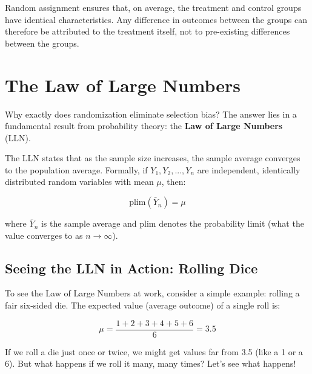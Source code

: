 \documentclass[
  letterpaper,
  DIV=11,
  numbers=noendperiod]{scrreprt}
\begin{document}
\begin{tcolorbox}[enhanced jigsaw, arc=.35mm, bottomrule=.15mm, bottomtitle=1mm, breakable, colback=white, colbacktitle=quarto-callout-important-color!10!white, colframe=quarto-callout-important-color-frame, coltitle=black, left=2mm, leftrule=.75mm, opacityback=0, opacitybacktitle=0.6, rightrule=.15mm, title=\textcolor{quarto-callout-important-color}{\faExclamation}\hspace{0.5em}{Why Randomization Works}, titlerule=0mm, toprule=.15mm, toptitle=1mm]

Random assignment ensures that, on average, the treatment and control
groups have identical characteristics. Any difference in outcomes
between the groups can therefore be attributed to the treatment itself,
not to pre-existing differences between the groups.

\end{tcolorbox}

\section{The Law of Large Numbers}\label{the-law-of-large-numbers}

Why exactly does randomization eliminate selection bias? The answer lies
in a fundamental result from probability theory: the \textbf{Law of
Large Numbers} (LLN).

The LLN states that as the sample size increases, the sample average
converges to the population average. Formally, if \(Y_1, Y_2, ..., Y_n\)
are independent, identically distributed random variables with mean
\(\mu\), then:

\[
\text{plim}(\bar{Y}_n) = \mu
\]

where \(\bar{Y}_n\) is the sample average and \(\text{plim}\) denotes
the probability limit (what the value converges to as \(n \to \infty\)).

\subsection{Seeing the LLN in Action: Rolling
Dice}\label{seeing-the-lln-in-action-rolling-dice}

To see the Law of Large Numbers at work, consider a simple example:
rolling a fair six-sided die. The expected value (average outcome) of a
single roll is:

\[
\mu = \frac{1 + 2 + 3 + 4 + 5 + 6}{6} = 3.5
\]

If we roll a die just once or twice, we might get values far from 3.5
(like a 1 or a 6). But what happens if we roll it many, many times?
Let's see what happens!
\end{document}

